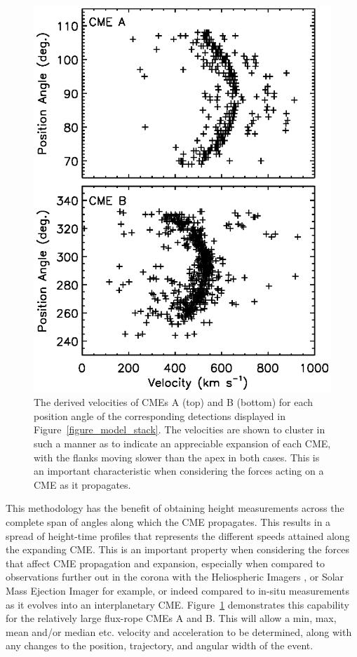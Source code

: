 \documentclass[preprint2]{aastex}
\begin{document}
\begin{figure}[!t]
\centerline{\includegraphics[scale=0.65, clip=true, trim=0 0 0 0]{figure_model_vel_angles_CMEsAB.eps}}
\caption{The derived velocities of CMEs A (top) and B (bottom) for each position angle of the corresponding detections displayed in Figure~\ref{figure_model_stack}. The velocities are shown to cluster in such a manner as to indicate an appreciable expansion of each CME, with the flanks moving slower than the apex in both cases. This is an important characteristic when considering the forces acting on a CME as it propagates.}
\label{figure_model_vel_angles_CMEsAB}
\end{figure}

This methodology has the benefit of obtaining height measurements across the complete span of angles along which the CME propagates. This results in a spread of height-time profiles that represents the different speeds attained along the expanding CME. This is an important property when considering the forces that affect CME propagation and expansion, especially when compared to observations further out in the corona with the Heliospheric Imagers \citep[HI;][]{2009SoPh..254..387E}, or Solar Mass Ejection Imager \citep[SMEI;][]{2004SoPh..225..177J} for example, or indeed compared to in-situ measurements as it evolves into an interplanetary CME. Figure~\ref{figure_model_vel_angles_CMEsAB} demonstrates this capability for the relatively large flux-rope CMEs A and B. This will allow a min, max, mean and/or median etc. velocity and acceleration to be determined, along with any changes to the position, trajectory, and angular width of the event.
\end{document}
